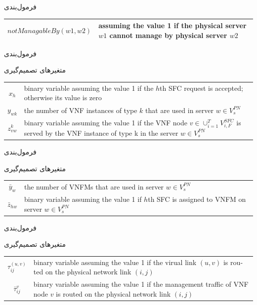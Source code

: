 \documentclass{beamer}
\begin{document}
\begin{persian}
\begin{frame}{فرمول‌بندی}
\begin{center}
\begin{latin}
\begin{tabular}{|c|p{5cm}|}
        \hline
        \(notManagableBy(w1, w2)\) & assuming the value 1 if the physical server \(w1\) cannot manage by physical server \(w2\) \\
        \hline
    \end{tabular}\end{latin}\end{center}
\end{frame}
\begin{frame}{فرمول‌بندی}
    \par
    متغیرهای تصمیم‌گیری
    \begin{latin}\begin{tabular}{c p{10cm}}
        $x_h$ & binary variable assuming the value 1 if the $h$th SFC request is accepted; otherwise its value is zero \\
        $y_{wk}$ & the number of VNF instances of type $k$ that are used in server $w \in V_s^{PN}$ \\
        $z^k_{vw}$ & binary variable assuming the value 1 if the VNF node $v \in \cup_{i=1}^{T} V_{i, F}^{SFC}$ is served by the VNF instance of type k in the server $w \in V_s^{PN}$ \\
    \end{tabular}\end{latin}
\end{frame}
\begin{frame}{فرمول‌بندی}
    \par
    متغیرهای تصمیم‌گیری
    \begin{latin}\begin{tabular}{c p{10cm}}
        $\bar{y}_w$ & the number of VNFMs that are used in server $w \in V_s^{PN}$\\
        $\bar{z}_{hw}$ & binary variable assuming the value 1 if $h$th SFC is assigned to VNFM on server $w \in V_s^{PN}$\\
    \end{tabular}\end{latin}
\end{frame}
\begin{frame}{فرمول‌بندی}
    \par
    متغیرهای تصمیم‌گیری
    \begin{latin}\begin{tabular}{c p{10cm}}
        $\tau^{(u,v)}_{ij}$ & binary variable assuming the value 1 if the virual link $(u,v)$ is routed on the physical network link $(i,j)$\\
        $\bar{\tau}^{v}_{ij}$ & binary variable assuming the value 1 if the management traffic of VNF node $v$ is routed on the physical network link $(i,j)$\\
    \end{tabular}\end{latin}
\end{frame}
\end{persian}
\end{document}
